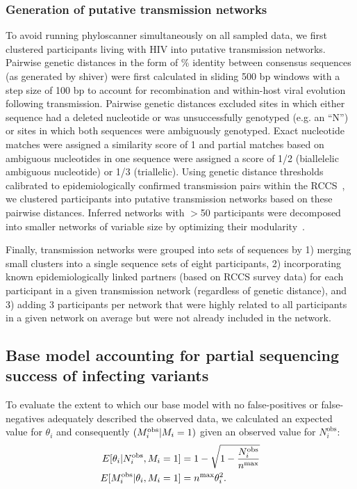\documentclass[10pt,letterpaper]{article}
\newcommand{\MI}{M^{\text{\text{obs}}}}
\begin{document}
\subsubsection{Generation of putative transmission networks}
To avoid running phyloscanner simultaneously on all sampled data, we first clustered participants living with HIV into putative transmission networks. Pairwise genetic distances in the form of \% identity between consensus sequences (as generated by shiver) were first calculated in sliding 500 bp windows with a step size of 100 bp to account for recombination and within-host viral evolution following transmission. Pairwise genetic distances excluded sites in which either sequence had a deleted nucleotide or was unsuccessfully genotyped (e.g. an ``N'') or sites in which both sequences were ambiguously genotyped. Exact nucleotide matches were assigned a similarity score of 1 and partial matches based on ambiguous nucleotides in one sequence were assigned a score of 1/2 (biallelelic ambiguous nucleotide) or 1/3 (triallelic). Using genetic distance thresholds calibrated to epidemiologically confirmed transmission pairs within the RCCS~\cite{ratmann2019}, we clustered participants into putative transmission networks based on these pairwise distances. Inferred networks with $>$50 participants were decomposed into smaller networks of variable size by optimizing their modularity~\cite{blondel2008}.\par 

Finally, transmission networks were grouped into sets of sequences by 1) merging small clusters into a single sequence sets of eight participants, 2) incorporating known epidemiologically linked partners (based on RCCS survey data) for each participant in a given transmission network (regardless of genetic distance), and 3) adding 3 participants per network that were highly related to all participants in a given network on average but were not already included in the network. \par
\subsection{Base model accounting for partial sequencing success of infecting variants}
To evaluate the extent to which our base model with no false-positives or false-negatives adequately described the observed data, we calculated an expected value for $\theta_i$ and consequently $(\MI_i | M_i = 1)$ given an observed value for $N^{\text{obs}}_i$:
\begin{align}
   E[\theta_i | N^{\text{obs}}_i, M_i = 1] &= 1 - \sqrt{1-\frac{N^{\text{obs}}_i}{{n^{\text{max}}}}} \\
   E[\MI_i | \theta_i, M_i = 1] &= {n^{\text{max}}}\theta_i^2. 
   \label{eq:phi_MI_expectation}
\end{align}
\linespread{1}

\end{document}
